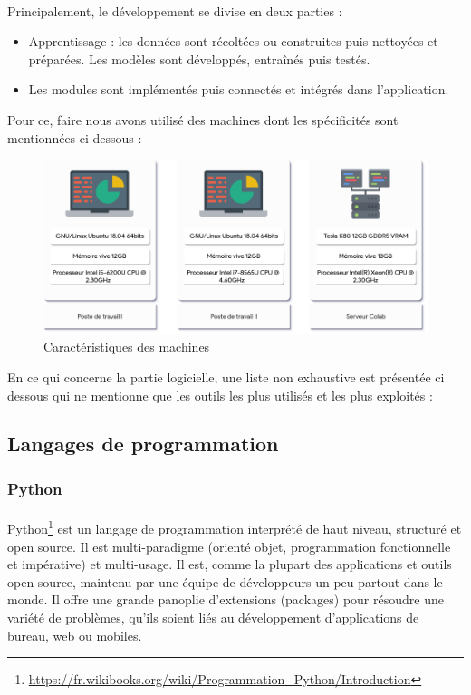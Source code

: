 	\paragraph{}
	Principalement, le développement se divise en deux parties : 
	\begin{itemize}
		\item Apprentissage : les données sont récoltées ou construites puis nettoyées et préparées. Les modèles sont développés, entraînés puis testés.
		\item Les modules sont implémentés puis connectés et intégrés dans l'application.
	\end{itemize}
	\par Pour ce, faire nous avons utilisé des machines dont les spécificités sont mentionnées ci-dessous :
	\begin{figure}[H] 
		\centering
		\includegraphics[width=0.88\linewidth]{images/implementation/machines.png}
		\caption{Caractéristiques des machines}
		\label{fig:machines}
		
	\end{figure}
	\par
	En ce qui concerne la partie logicielle, une liste non exhaustive est présentée ci dessous qui ne mentionne que les outils les plus utilisés et les plus exploités :
	\subsection{Langages de programmation}
		\subsubsection*{Python}
		\label{python}
		\paragraph{}
		 Python\footnote{\url{https://fr.wikibooks.org/wiki/Programmation_Python/Introduction}} est un langage de programmation interprété de haut niveau, structuré et open source. Il est multi-paradigme (orienté objet, programmation fonctionnelle et impérative) et multi-usage. Il est, comme la plupart des applications et outils open source, maintenu par une équipe de développeurs un peu partout dans le monde. Il offre une grande panoplie d'extensions (packages) pour résoudre une variété de problèmes, qu'ils soient liés au développement d'applications de bureau, web ou mobiles.
		
